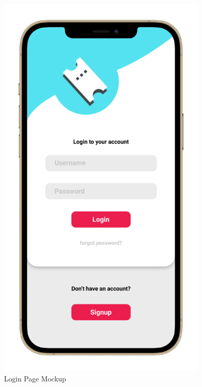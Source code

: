 \begin{figure}
    \centering
    \begin{minipage}{.45\linewidth}
    \includegraphics[width=0.9\textwidth]{Images/UserInterfaces/withiphonephrames/LoginPage_iphone12promaxgold_portrait.png}
    \caption{\label{fig:InterfacesDiagram}{Login Page Mockup}}
\end{minipage}
\hspace{.05\linewidth}
\begin{minipage}{.45\linewidth}

\end{minipage}
\end{figure}
